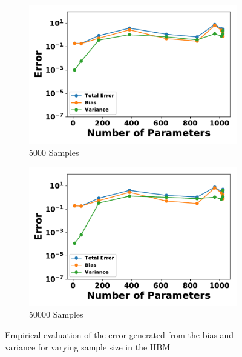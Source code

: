 \documentclass[letterpaper]{article} %
\begin{document}
\begin{figure}[p]
\begin{subfigure}[b]{0.245\textwidth}
              \includegraphics[width=\textwidth]{./HBM_Error_vs_Order_Samples5000-eps-converted-to.pdf}
              \caption{5000 Samples}
          \end{subfigure}
          \begin{subfigure}[b]{0.245\textwidth}
              \centering
              \includegraphics[width=\textwidth]{./HBM_Error_vs_Order_Samples50000-eps-converted-to.pdf}
              \caption{50000 Samples}
          \end{subfigure}
          \caption{Empirical evaluation of the error generated from the bias and variance for varying sample size in the HBM} \label{fig:HBM_hidden_nodes}
        \end{figure}
        
        
\end{document}
